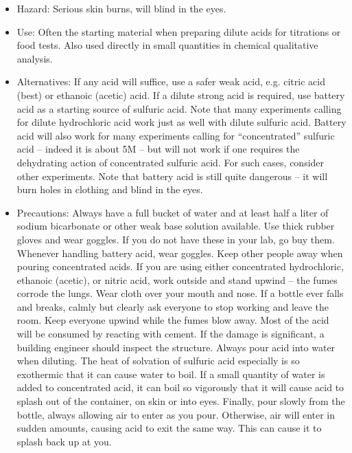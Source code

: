 \begin{itemize}

\item{Hazard: Serious skin burns, will blind in the eyes.}

\item{Use: Often the starting material 
when preparing dilute acids for titrations or food tests. 
Also used directly in small quantities in chemical qualitative analysis.}

\item{Alternatives: If any acid will suffice, use a safer weak acid, 
e.g. citric acid (best) or ethanoic (acetic) acid. 
If a dilute strong acid is required, 
use battery acid as a starting source of sulfuric acid. 
Note that many experiments calling for dilute hydrochloric acid 
work just as well with dilute sulfuric acid. 
Battery acid will also work for many experiments 
calling for “concentrated” sulfuric acid – 
indeed it is about 5M – but will not work if one requires 
the dehydrating action of concentrated sulfuric acid. 
For such cases, consider other experiments. 
Note that battery acid is still quite dangerous – 
it will burn holes in clothing and blind in the eyes.}

\item{Precautions: Always have a full bucket of water 
and at least half a liter of sodium bicarbonate 
or other weak base solution available. 
Use thick rubber gloves and wear goggles. 
If you do not have these in your lab, go buy them. 
Whenever handling battery acid, wear goggles. 
Keep other people away when pouring concentrated acids. 
If you are using either concentrated hydrochloric, ethanoic (acetic), 
or nitric acid, work outside and stand upwind -- the fumes corrode the lungs. 
Wear cloth over your mouth and nose. 
If a bottle ever falls and breaks, 
calmly but clearly ask everyone to stop working and leave the room. 
Keep everyone upwind while the fumes blow away. 
Most of the acid will be consumed by reacting with cement. 
If the damage is significant, a building engineer should inspect the structure. 
Always pour acid into water when diluting. 
The heat of solvation of sulfuric acid especially is so exothermic 
that it can cause water to boil. 
If a small quantity of water is added to concentrated acid, 
it can boil so vigorously that it will cause acid to splash 
out of the container, on skin or into eyes. 
Finally, pour slowly from the bottle, 
always allowing air to enter as you pour. 
Otherwise, air will enter in sudden amounts, 
causing acid to exit the same way. 
This can cause it to splash back up at you.}


\end{itemize}
